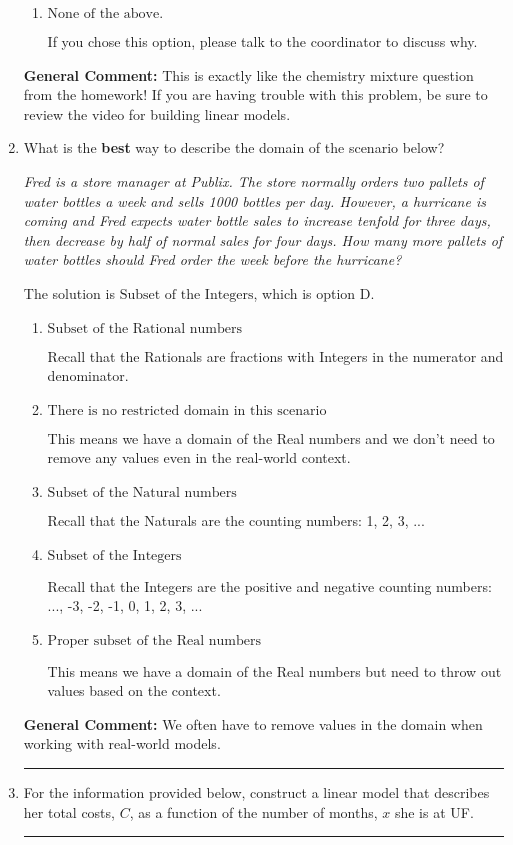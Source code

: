 \documentclass{extbook}[14pt]
\newcommand{\litem}[1]{\item #1

\rule{\textwidth}{0.4pt}}
\begin{document}
\begin{enumerate}
{\begin{enumerate}[label=\Alph*.]
This models the cost of the low-quality bean only, not the blended beans.
\item \( \text{None of the above.} \)

If you chose this option, please talk to the coordinator to discuss why.
\end{enumerate}

\textbf{General Comment:} This is exactly like the chemistry mixture question from the homework! If you are having trouble with this problem, be sure to review the video for building linear models.
}
\litem{
What is the \textbf{best} way to describe the domain of the scenario below?

\begin{center}
    \textit{ Fred is a store manager at Publix. The store normally orders two pallets of water bottles a week and sells 1000 bottles per day. However, a hurricane is coming and Fred expects water bottle sales to increase tenfold for three days, then decrease by half of normal sales for four days. How many more pallets of water bottles should Fred order the week before the hurricane? }
\end{center}
The solution is \( \text{Subset of the Integers} \), which is option D.\begin{enumerate}[label=\Alph*.]
\item \( \text{Subset of the Rational numbers} \)

Recall that the Rationals are fractions with Integers in the numerator and denominator.
\item \( \text{There is no restricted domain in this scenario} \)

This means we have a domain of the Real numbers and we don't need to remove any values even in the real-world context.
\item \( \text{Subset of the Natural numbers} \)

Recall that the Naturals are the counting numbers: 1, 2, 3, ...
\item \( \text{Subset of the Integers} \)

Recall that the Integers are the positive and negative counting numbers: ..., -3, -2, -1, 0, 1, 2, 3, ... 
\item \( \text{Proper subset of the Real numbers} \)

This means we have a domain of the Real numbers but need to throw out values based on the context.
\end{enumerate}

\textbf{General Comment:} We often have to remove values in the domain when working with real-world models.
}
\litem{
For the information provided below, construct a linear model that describes her total costs, $C$, as a function of the number of months, $x$ she is at UF. 

}
\end{enumerate}
\end{document}

